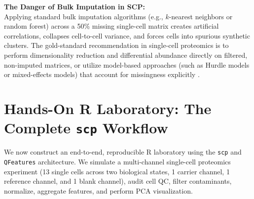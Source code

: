 \documentclass[11pt,twoside,openright]{book}
\begin{document}
\begin{deepdive}
\textbf{The Danger of Bulk Imputation in SCP:}\\
Applying standard bulk imputation algorithms (e.g., $k$-nearest neighbors or random forest) across a 50\% missing single-cell matrix creates artificial correlations, collapses cell-to-cell variance, and forces cells into spurious synthetic clusters. The gold-standard recommendation in single-cell proteomics is to perform dimensionality reduction and differential abundance directly on filtered, non-imputed matrices, or utilize model-based approaches (such as Hurdle models or mixed-effects models) that account for missingness explicitly \cite{choi2014msstats, amenta2022pseudoreplication}.
\end{deepdive}

\section{Hands-On R Laboratory: The Complete \texttt{scp} Workflow}

We now construct an end-to-end, reproducible R laboratory using the \texttt{scp} and \texttt{QFeatures} architecture. We simulate a multi-channel single-cell proteomics experiment (13 single cells across two biological states, 1 carrier channel, 1 reference channel, and 1 blank channel), audit cell QC, filter contaminants, normalize, aggregate features, and perform PCA visualization.
\end{document}
